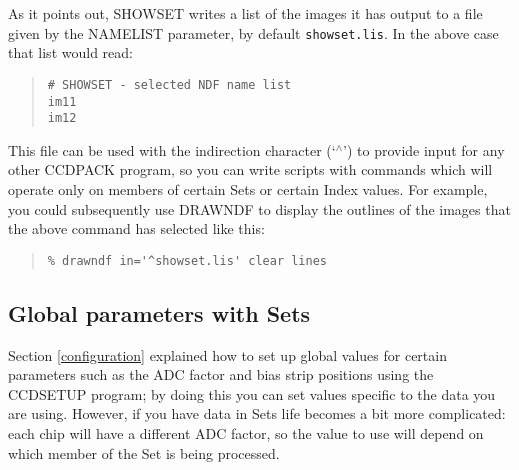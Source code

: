 \documentclass[twoside,11pt]{article}
\newcommand{\htmlref}[2]{#1}
\newcommand{\latexhtml}[2]{#1}
\newcommand{\xlabel}[1]{}
\renewcommand{\_}{\texttt{\symbol{95}}}
\newcommand{\ttsize}{\latexhtml{\small}{}}
\newenvironment{myquote}{\begin{quote}\ttsize}{\end{quote}}
\newcommand{\text}[1]{{\ttsize \tt #1}}
\newcommand{\routine}[1]{{\sc #1}}
\newcommand{\xroutine}[1]{\htmlref{{\sc #1}}{#1}}
\begin{document}
As it points out, \routine{SHOWSET} writes a list of the images it
has output to a file given by the NAMELIST parameter, by default
\text{showset.lis}. 
In the above case that list would read:
\begin{myquote}
\begin{verbatim}
# SHOWSET - selected NDF name list
im11
im12
\end{verbatim}
\end{myquote}
This file can be used with the indirection character (`$^\wedge$')
to provide input for any other CCDPACK program, so you can write scripts
with commands which will operate only on members of certain Sets
or certain Index values.
For example, you could subsequently use \xroutine{DRAWNDF} to
display the outlines of the images that the above command has
selected like this:
\begin{myquote}
\begin{verbatim}
% drawndf in='^showset.lis' clear lines
\end{verbatim}
\end{myquote}


\subsection{\label{setglobals}\xlabel{setglobals}Global parameters with Sets}

Section \ref{configuration} explained how to set up global values for
certain parameters such as the ADC factor and bias strip positions
using the \xroutine{CCDSETUP} program; by doing this you can 
set values specific to the data you are using.
However, if you have data in Sets life becomes a bit more complicated:
each chip will have a different ADC factor, so the value to use 
will depend on which member of the Set is being processed.
\end{document}
